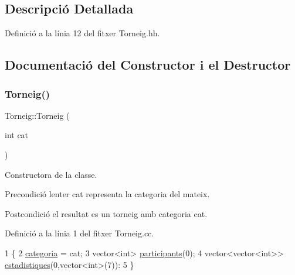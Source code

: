 \subsection{Descripció Detallada}


Definició a la línia 12 del fitxer Torneig.\+hh.



\subsection{Documentació del Constructor i el Destructor}
\mbox{\label{class_torneig_a9794723939612dccda9f9a3979789b11}} 
\subsubsection{\texorpdfstring{Torneig()}{Torneig()}}
{\footnotesize\ttfamily Torneig\+::\+Torneig (\begin{DoxyParamCaption}\item[{int}]{cat }\end{DoxyParamCaption})}



Constructora de la classe. 

\begin{DoxyPrecond}{Precondició}
l\textquotesingle{}enter cat representa la categoria del mateix. 
\end{DoxyPrecond}
\begin{DoxyPostcond}{Postcondició}
el resultat es un torneig amb categoria cat. 
\end{DoxyPostcond}


Definició a la línia 1 del fitxer Torneig.\+cc.


\begin{DoxyCode}
1                         \{
2     \mbox{\hyperlink{class_torneig_a8a80ab41ebab7d88a2569247c6ec4c81}{categoria}} = cat;
3     vector<int> \mbox{\hyperlink{class_torneig_a7146b542f678d15c1847f9ec57c866bf}{participants}}(0);
4     vector<vector<int>> \mbox{\hyperlink{class_torneig_afb270c579c18c46261a52122fb152942}{estadistiques}}(0,vector<int>(7)):
5 \}
\end{DoxyCode}
\mbox{\label{class_torneig_ab5184085575669dd522e11a25f602943}} 
